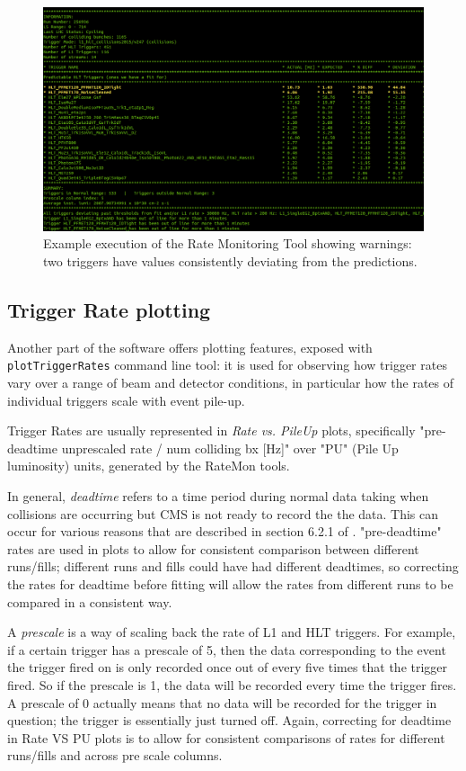 \begin{figure}
    \centerline{
        \includegraphics[width=0.8\paperwidth]{figures/ratemon_warnings}}
    \caption{Example execution of the Rate Monitoring Tool showing warnings: two triggers have values consistently deviating from the predictions. \cite{ratemon-twiki}}
    \label{fig:ratemon_warnings}
\end{figure}

\subsection{Trigger Rate plotting}

Another part of the software offers plotting features, exposed with \texttt{plotTriggerRates} command line tool: it is used for observing how trigger rates vary over a range of beam and detector conditions, in particular how the rates of individual triggers scale with event pile-up.

Trigger Rates are usually represented in \textit{Rate vs. PileUp} plots, specifically "pre-deadtime unprescaled rate / num colliding bx [Hz]" over "PU" (Pile Up luminosity) units, generated by the RateMon tools.

In general, \textit{deadtime} refers to a time period during normal data taking when collisions are occurring but CMS is not ready to record the the data. This can occur for various reasons that are described in section 6.2.1 of \cite{Khachatryan_2017}. "pre-deadtime" rates are used in plots to allow for consistent comparison between different runs/fills; different runs and fills could have had different deadtimes, so correcting the rates for deadtime before fitting will allow the rates from different runs to be compared in a consistent way.

A \textit{prescale} is a way of scaling back the rate of L1 and HLT triggers. For example, if a certain trigger has a prescale of 5, then the data corresponding to the event the trigger fired on is only recorded once out of every five times that the trigger fired. So if the prescale is 1, the data will be recorded every time the trigger fires. A prescale of 0 actually means that no data will be recorded for the trigger in question; the trigger is essentially just turned off. Again, correcting for deadtime in Rate VS PU plots is to allow for consistent comparisons of rates for different runs/fills and across pre scale columns. 

